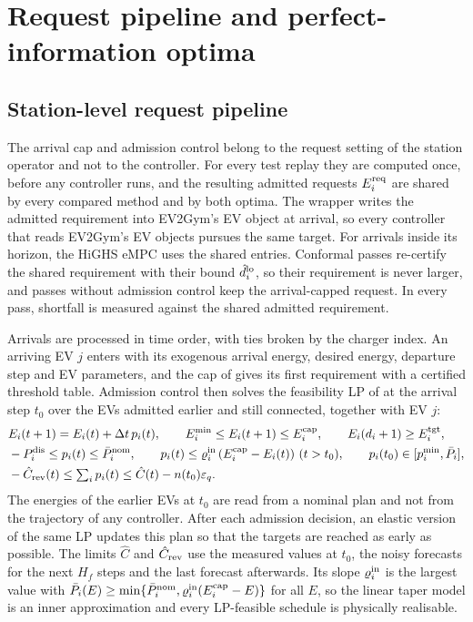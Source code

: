 \section{Request pipeline and perfect-information optima}\label{sec:pipeline}

\subsection{Station-level request pipeline}\label{app:admission}

The arrival cap and admission control belong to the request setting of the station operator and not to the controller.
For every test replay they are computed once, before any controller runs, and the resulting admitted requests $E^{\mathrm{req}}_i$ are shared by every compared method and by both optima.
The wrapper writes the admitted requirement into EV2Gym's EV object at arrival, so every controller that reads EV2Gym's EV objects pursues the same target.
For arrivals inside its horizon, the HiGHS eMPC uses the shared entries.
Conformal passes re-certify the shared requirement with their bound $\hat d_i^{\mathrm{lo}}$, so their requirement is never larger, and passes without admission control keep the arrival-capped request.
In every pass, shortfall is measured against the shared admitted requirement.

Arrivals are processed in time order, with ties broken by the charger index.
An arriving EV $j$ enters with its exogenous arrival energy, desired energy, departure step and EV parameters, and the cap of  gives its first requirement with a certified threshold table.
Admission control then solves the feasibility LP of  at the arrival step $t_0$ over the EVs admitted earlier and still connected, together with EV $j$:
\begin{equation}\label{eq:admission}
\begin{aligned}
&E_i(t+1)=E_i(t)+\Delta t\,p_i(t),\qquad E_i^{\min}\le E_i(t+1)\le E_i^{\mathrm{cap}},\qquad E_i(d_i+1)\ge E_i^{\mathrm{tgt}},\\
&-P^{\mathrm{dis}}_i\le p_i(t)\le\bar P^{\mathrm{nom}}_i,\qquad p_i(t)\le\varrho_i^{\mathrm{in}}\,(E_i^{\mathrm{cap}}-E_i(t))\ (t>t_0),\qquad p_i(t_0)\in[p^{\min}_i,\bar P_i],\\
&-\hat C_{\mathrm{rev}}(t)\le\textstyle\sum_ip_i(t)\le\hat C(t)-n(t_0)\varepsilon_q .
\end{aligned}
\end{equation}
The energies of the earlier EVs at $t_0$ are read from a nominal plan and not from the trajectory of any controller.
After each admission decision, an elastic version of the same LP updates this plan so that the targets are reached as early as possible.
The limits $\hat C$ and $\hat C_{\mathrm{rev}}$ use the measured values at $t_0$, the noisy forecasts for the next $H_f$ steps and the last forecast afterwards.
Its slope $\varrho_i^{\mathrm{in}}$ is the largest value with $\bar P_i(E)\ge\min\{\bar P^{\mathrm{nom}}_i,\varrho_i^{\mathrm{in}}(E_i^{\mathrm{cap}}-E)\}$ for all $E$, so the linear taper model is an inner approximation and every LP-feasible schedule is physically realisable.

